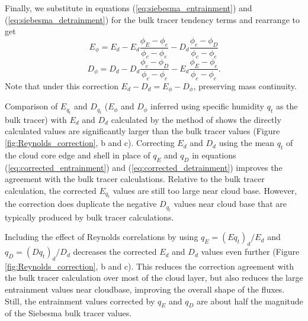 \documentclass[draft,grl]{agutex}
\begin{document}
\begin{article}
Finally, we substitute in equations (\ref{eq:siebesma_entrainment}) and 
(\ref{eq:siebesma_detrainment}) for the bulk tracer tendency terms and 
rearrange to get
\begin{equation}
  \label{eq:corrected_entrainment}
    E_{\phi} = E_d - E_d\frac{\phi_E - \phi_e}{\phi_{c} - \phi_{e}}
             - D_d\frac{\phi_c - \phi_D}{\phi_{c} - \phi_{e}}
\end{equation}
\begin{equation}
  \label{eq:corrected_detrainment}
    D_{\phi} = D_d - D_d\frac{\phi_c - \phi_D}{\phi_{c} - \phi_{e}}
             - E_d\frac{\phi_E - \phi_e}{\phi_{c} - \phi_{e}}.
\end{equation}
Note that under this correction $E_d-D_d = E_{\phi}-D_{\phi}$, preserving 
mass continuity.

Comparison of $E_{q_t}$ and $D_{q_t}$ ($E_{\phi}$ and $D_{\phi}$ inferred using 
specific humidity $q_t$ as the bulk tracer) with $E_d$ and $D_d$ calculated by 
the method of \cite{Romps2010} shows the directly calculated values are 
significantly larger than the bulk tracer values (Figure 
\ref{fig:Reynolds_correction}, b and c).  Correcting $E_d$ and $D_d$ using the 
mean $q_t$ of the cloud core edge and shell in place of $q_E$ and $q_D$ in 
equations (\ref{eq:corrected_entrainment}) and (\ref{eq:corrected_detrainment})
improves the agreement with the bulk tracer calculations.  Relative to the bulk 
tracer calculation, the corrected $E_{q_t}$ values are still too large near 
cloud base.  However, the correction does duplicate the negative $D_{q_t}$ 
values near cloud base that are typically produced by bulk tracer calculations.

Including the effect of Reynolds correlations by using $q_E = (E q_t)_d/E_d$ 
and $q_D = (D q_t)_d/D_d$ decreases the corrected $E_d$ and $D_d$ values even 
further (Figure \ref{fig:Reynolds_correction}, b and c).  This reduces the 
correction agreement with the bulk tracer calculation over most of the cloud 
layer, but also reduces the large entrainment values near cloudbase, improving 
the overall shape of the fluxes.  Still, the entrainment values corrected by 
$q_E$ and $q_D$ are about half the magnitude of the Siebesma bulk tracer 
values.


\end{article}
\end{document}
